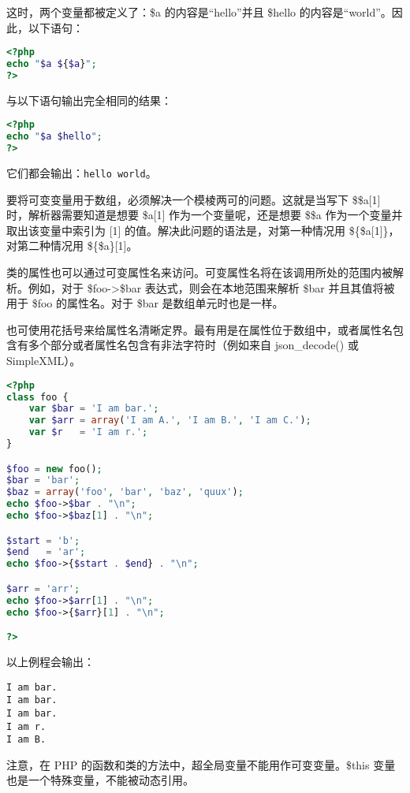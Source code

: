 这时，两个变量都被定义了：\$a 的内容是“hello”并且 \$hello 的内容是“world”。因此，以下语句：



\begin{lstlisting}[language=PHP]
<?php
echo "$a ${$a}";
?>
\end{lstlisting}

与以下语句输出完全相同的结果：

\begin{lstlisting}[language=PHP]
<?php
echo "$a $hello";
?>
\end{lstlisting}

它们都会输出：\verb|hello world|。



要将可变变量用于数组，必须解决一个模棱两可的问题。这就是当写下 \$\$a[1] 时，解析器需要知道是想要 \$a[1] 作为一个变量呢，还是想要 \$\$a 作为一个变量并取出该变量中索引为 [1] 的值。解决此问题的语法是，对第一种情况用 \$\{\$a[1]\}，对第二种情况用 \$\{\$a\}[1]。

类的属性也可以通过可变属性名来访问。可变属性名将在该调用所处的范围内被解析。例如，对于 \$foo->\$bar 表达式，则会在本地范围来解析 \$bar 并且其值将被用于 \$foo 的属性名。对于 \$bar 是数组单元时也是一样。

也可使用花括号来给属性名清晰定界。最有用是在属性位于数组中，或者属性名包含有多个部分或者属性名包含有非法字符时（例如来自 json\_decode() 或 SimpleXML）。




\begin{lstlisting}[language=PHP]
<?php
class foo {
    var $bar = 'I am bar.';
    var $arr = array('I am A.', 'I am B.', 'I am C.');
    var $r   = 'I am r.';
}

$foo = new foo();
$bar = 'bar';
$baz = array('foo', 'bar', 'baz', 'quux');
echo $foo->$bar . "\n";
echo $foo->$baz[1] . "\n";

$start = 'b';
$end   = 'ar';
echo $foo->{$start . $end} . "\n";

$arr = 'arr';
echo $foo->$arr[1] . "\n";
echo $foo->{$arr}[1] . "\n";

?>
\end{lstlisting}


以上例程会输出：

\begin{verbatim}
I am bar.
I am bar.
I am bar.
I am r.
I am B.
\end{verbatim}

注意，在 PHP 的函数和类的方法中，超全局变量不能用作可变变量。\$this 变量也是一个特殊变量，不能被动态引用。


